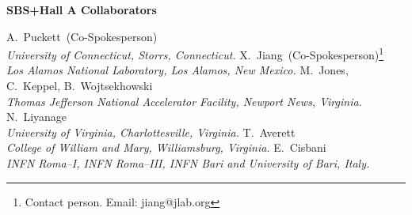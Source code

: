 
\centerline{\Large\bf SBS+Hall A Collaborators}
\vskip 0.3in

\begin{center}
\vskip 0.15in
A.~Puckett~(Co-Spokesperson) \\
{\it University of Connecticut,  Storrs, Connecticut.}
%
\vskip 0.15in
X.~Jiang~(Co-Spokesperson)\footnote{Contact person. Email: jiang@jlab.org}  \\
 {\it  Los Alamos National Laboratory, Los Alamos, New Mexico.}
\vskip 0.15in
M.~Jones, C.~Keppel,  B.~Wojtsekhowski  \\
{\it  Thomas Jefferson National Accelerator Facility, Newport News, Virginia.}
%
\vskip 0.15in
N.~Liyanage \\ 
%  
{\it University of Virginia, Charlottesville, Virginia.}
%
\vskip 0.15in
T.~Averett \\
{\it  College of William and Mary, Williamsburg, Virginia.}
%
\vskip 0.15in
E.~Cisbani \\ 
{\it INFN Roma--I, INFN Roma--III, INFN Bari and University of Bari, Italy.}  
\end{center}
